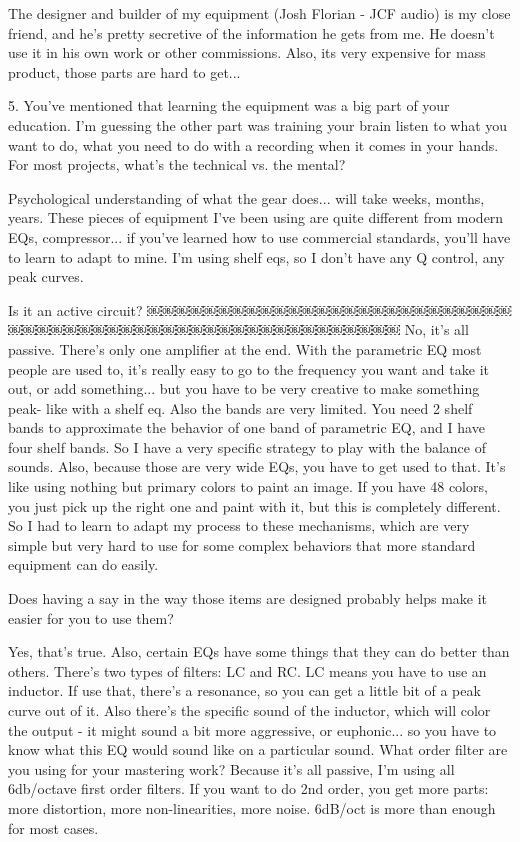 The designer and builder of my equipment (Josh Florian - JCF audio) is my close friend, and he's pretty secretive of the information he gets from me. He doesn't use it in his own work or other commissions. Also, its very expensive for mass product, those parts are hard to get...

5. You've mentioned that learning the equipment was a big part of your education. I'm guessing the other part was training your brain listen to what you want to do, what you need to do with a recording when it comes in your hands. For most projects, what's the technical vs. the mental?

Psychological understanding of what the gear does... will take weeks, months, years. These pieces of equipment I've been using are quite different from modern EQs, compressor... if you've learned how to use commercial standards, you'll have to learn to adapt to mine. I'm using shelf eqs, so I don't have any Q control, any peak curves.

Is it an active circuit?
￼￼￼￼￼￼￼￼￼￼￼￼￼￼￼￼￼￼￼￼￼￼￼￼￼￼￼￼￼￼￼￼￼￼￼￼￼￼￼￼￼￼￼￼￼￼￼￼￼￼￼￼￼￼
No, it's all passive. There's only one amplifier at the end. With the parametric EQ most people are used to, it's really easy to go to the frequency you want and take it out, or add something... but you have to be very creative to make something peak- like with a shelf eq. Also the bands are very limited. You need 2 shelf bands to approximate the behavior of one band of parametric EQ, and I have four shelf bands. So I have a very specific strategy to play with the balance of sounds. Also, because those are very wide EQs, you have to get used to that. It's like using nothing but primary colors to paint an image. If you have 48 colors, you just pick up the right one and paint with it, but this is completely different. So I had to learn to adapt my process to these mechanisms, which are very simple but very hard to use for some complex behaviors that more standard equipment can do easily.

Does having a say in the way those items are designed probably helps make it easier for you to use them?

Yes, that's true. Also, certain EQs have some things that they can do better than others. There's two types of filters: LC and RC. LC means you have to use an inductor. If use that, there's a resonance, so you can get a little bit of a peak curve out of it. Also there's the specific sound of the inductor, which will color the output - it might sound a bit more aggressive, or euphonic... so you have to know what this EQ would sound like on a particular sound.
What order filter are you using for your mastering work?
Because it's all passive, I'm using all 6db/octave first order filters. If you want to do 2nd order, you get more parts: more distortion, more non-linearities, more noise. 6dB/oct is more than enough for most cases.

